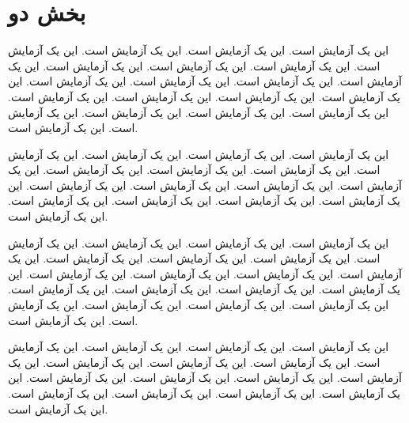 \documentclass[twocolumn]{book}
\begin{document}
\section{بخش دو}
این یک آزمایش است. این یک آزمایش است. این یک آزمایش است. این یک آزمایش است. 
این یک آزمایش است. این یک آزمایش است. این یک آزمایش است. این یک آزمایش است. 
این یک آزمایش است. این یک آزمایش است. این یک آزمایش است. این یک آزمایش است. 
این یک آزمایش است. این یک آزمایش است. این یک آزمایش است. این یک آزمایش است. 
این یک آزمایش است. این یک آزمایش است. این یک آزمایش است. این یک آزمایش است. 

این یک آزمایش است. این یک آزمایش است. این یک آزمایش است. این یک آزمایش است. 
این یک آزمایش است. این یک آزمایش است. این یک آزمایش است. این یک آزمایش است. 
این یک آزمایش است. این یک آزمایش است. این یک آزمایش است. این یک آزمایش است. 
این یک آزمایش است. این یک آزمایش است. این یک آزمایش است. این یک آزمایش است. 

این یک آزمایش است. این یک آزمایش است. این یک آزمایش است. این یک آزمایش است. 
این یک آزمایش است. این یک آزمایش است. این یک آزمایش است. این یک آزمایش است. 
این یک آزمایش است. این یک آزمایش است. این یک آزمایش است. این یک آزمایش است. 
این یک آزمایش است. این یک آزمایش است. این یک آزمایش است. این یک آزمایش است. 
این یک آزمایش است. این یک آزمایش است. این یک آزمایش است. این یک آزمایش است. 

این یک آزمایش است. این یک آزمایش است. این یک آزمایش است. این یک آزمایش است. 
این یک آزمایش است. این یک آزمایش است. این یک آزمایش است. این یک آزمایش است. 
این یک آزمایش است. این یک آزمایش است. این یک آزمایش است. این یک آزمایش است. 
این یک آزمایش است. این یک آزمایش است. این یک آزمایش است. این یک آزمایش است. 
\end{document}
